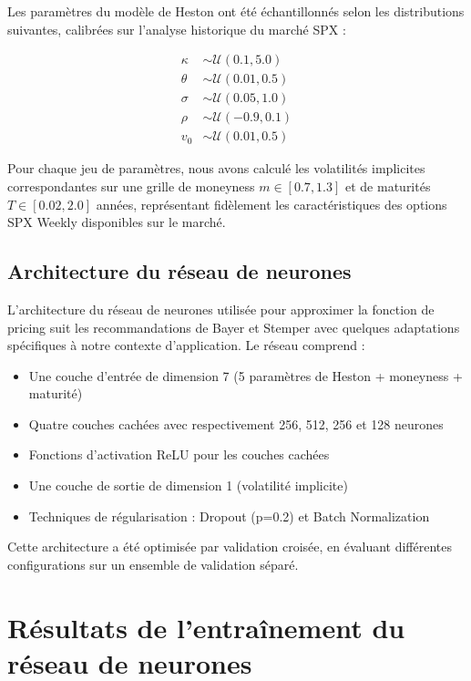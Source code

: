 Les paramètres du modèle de Heston ont été échantillonnés selon les distributions suivantes, calibrées sur l'analyse historique du marché SPX :

\begin{align}
\kappa &\sim \mathcal{U}(0.1, 5.0) \\
\theta &\sim \mathcal{U}(0.01, 0.5) \\
\sigma &\sim \mathcal{U}(0.05, 1.0) \\
\rho &\sim \mathcal{U}(-0.9, 0.1) \\
v_0 &\sim \mathcal{U}(0.01, 0.5)
\end{align}

Pour chaque jeu de paramètres, nous avons calculé les volatilités implicites correspondantes sur une grille de moneyness $m \in [0.7, 1.3]$ et de maturités $T \in [0.02, 2.0]$ années, représentant fidèlement les caractéristiques des options SPX Weekly disponibles sur le marché.

\subsection{Architecture du réseau de neurones}

L'architecture du réseau de neurones utilisée pour approximer la fonction de pricing suit les recommandations de Bayer et Stemper avec quelques adaptations spécifiques à notre contexte d'application. Le réseau comprend :

\begin{itemize}
\item Une couche d'entrée de dimension 7 (5 paramètres de Heston + moneyness + maturité)
\item Quatre couches cachées avec respectivement 256, 512, 256 et 128 neurones
\item Fonctions d'activation ReLU pour les couches cachées
\item Une couche de sortie de dimension 1 (volatilité implicite)
\item Techniques de régularisation : Dropout (p=0.2) et Batch Normalization
\end{itemize}

Cette architecture a été optimisée par validation croisée, en évaluant différentes configurations sur un ensemble de validation séparé.

\section{Résultats de l'entraînement du réseau de neurones}

